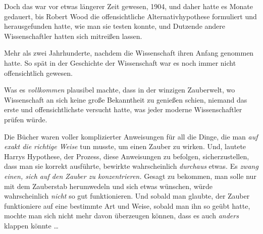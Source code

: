 Doch das war vor etwas längerer Zeit gewesen, 1904, und daher hatte es Monate gedauert, bis Robert Wood die offensichtliche Alternativhypothese formuliert und herausgefunden hatte, wie man sie testen konnte, und Dutzende andere Wissenschaftler hatten sich mitreißen lassen.

Mehr als zwei Jahrhunderte, nachdem die Wissenschaft ihren Anfang genommen hatte. So spät in der Geschichte der Wissenschaft war es noch immer nicht offensichtlich gewesen.

Was es \emph{vollkommen} plausibel machte, dass in der winzigen Zauberwelt, wo Wissenschaft an sich keine große Bekanntheit zu genießen schien, niemand das erste und offensichtlichste versucht hatte, was jeder moderne Wissenschaftler prüfen würde.

Die Bücher waren voller komplizierter Anweisungen für all die Dinge, die man \emph{auf exakt die richtige Weise} tun musste, um einen Zauber zu wirken. Und, lautete Harrys Hypothese, der Prozess, diese Anweisungen zu befolgen, sicherzustellen, dass man sie korrekt ausführte, bewirkte wahrscheinlich \emph{durchaus} etwas. Es \emph{zwang einen, sich auf den Zauber zu konzentrieren.} Gesagt zu bekommen, man solle nur mit dem Zauberstab herumwedeln und sich etwas wünschen, würde wahrscheinlich \emph{nicht} so gut funktionieren. Und sobald man glaubte, der Zauber funktioniere auf eine bestimmte Art und Weise, sobald man ihn so geübt hatte, mochte man sich nicht mehr davon überzeugen können, dass es auch \emph{anders} klappen könnte …

